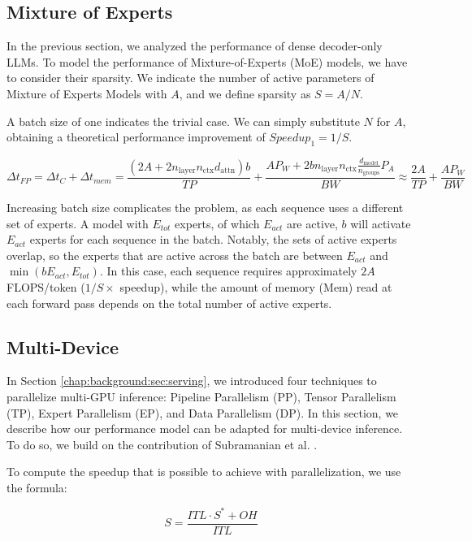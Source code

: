\subsection{Mixture of Experts}
\label{chap:model:sec:moe}

In the previous section, we analyzed the performance of dense decoder-only LLMs. To model the performance of Mixture-of-Experts (MoE) models, we have to consider their sparsity.
We indicate the number of active parameters of Mixture of Experts Models with $A$, and we define sparsity as $S=A/N$.

A batch size of one indicates the trivial case. We can simply substitute $N$ for $A$, obtaining a theoretical performance improvement of $Speedup_1 = 1/S$.

\[
\Delta t_{FP} = \Delta t_{C} + \Delta t_{mem} = \frac{(2A + 2n_\text{layer} n_{\text{ctx}} d_{\text{attn}})b}{TP} + \frac{AP_W + 2bn_\text{layer} n_{\text{ctx}} \frac{ d_{\text{model}}}{n_{\text{groups}}} P_A}{BW} \approx \frac{2A}{TP} + \frac{AP_W}{BW}
\]

Increasing batch size complicates the problem, as each sequence uses a different set of experts.
A model with $E_{tot}$ experts, of which $E_{act}$ are active, $b$ will activate $E_{act}$ experts for each sequence in the batch. Notably, the sets of active experts overlap, so the experts that are active across the batch are between $E_{act}$ and $\min(bE_{act},E_{tot})$.
In this case, each sequence requires approximately $2A$ FLOPS/token ($1/S \times$ speedup), while the amount of memory ($\text{Mem}$) read at each forward pass depends on the total number of active experts. 

\subsection{Multi-Device}
\label{chap:model:sec:multi}

In Section \ref{chap:background:sec:serving}, we introduced four techniques to parallelize multi-GPU inference: Pipeline Parallelism (PP), Tensor Parallelism (TP), Expert Parallelism (EP), and Data Parallelism (DP).
In this section, we describe how our performance model can be adapted for multi-device inference. To do so, we build on the contribution of Subramanian et al. \cite{subramanian2024comprehensive}.

To compute the speedup that is possible to achieve with parallelization, we use the formula:

\[
 S = \frac{ITL \cdot S^* +OH}{ITL}
\]

